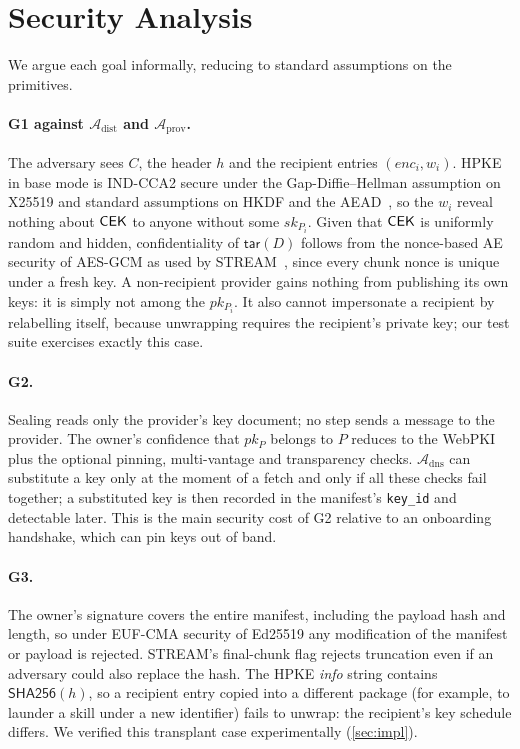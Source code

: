 \section{Security Analysis}
\label{sec:security}

We argue each goal informally, reducing to standard assumptions on the primitives.

\paragraph{G1 against $\mathcal{A}_{\text{dist}}$ and $\mathcal{A}_{\text{prov}}$.}
The adversary sees $C$, the header $h$ and the recipient entries $(enc_i, w_i)$. HPKE in base mode
is IND-CCA2 secure under the Gap-Diffie--Hellman assumption on X25519 and standard assumptions on
HKDF and the AEAD~\citep{rfc9180}, so the $w_i$ reveal nothing about $\mathsf{CEK}$ to anyone without some
$sk_{P_i}$. Given that $\mathsf{CEK}$ is uniformly random and hidden, confidentiality of $\mathsf{tar}(D)$
follows from the nonce-based AE security of AES-GCM as used by STREAM~\citep{hoang2015online}, since
every chunk nonce is unique under a fresh key. A non-recipient provider gains nothing from
publishing its own keys: it is simply not among the $pk_{P_i}$. It also cannot impersonate a
recipient by relabelling itself, because unwrapping requires the recipient's private key; our test
suite exercises exactly this case.

\paragraph{G2.} Sealing reads only the provider's key document; no step sends a message to the
provider. The owner's confidence that $pk_P$ belongs to $P$ reduces to the WebPKI plus the optional
pinning, multi-vantage and transparency checks. $\mathcal{A}_{\text{dns}}$ can substitute a key
only at the moment of a fetch and only if all these checks fail together; a substituted key is
then recorded in the manifest's \texttt{key\_id} and detectable later. This is the main security
cost of G2 relative to an onboarding handshake, which can pin keys out of band.

\paragraph{G3.} The owner's signature covers the entire manifest, including the payload hash and
length, so under EUF-CMA security of Ed25519 any modification of the manifest or payload is
rejected. STREAM's final-chunk flag rejects truncation even if an adversary could also replace the
hash. The HPKE \emph{info} string contains $\mathsf{SHA256}(h)$, so a recipient entry copied into a
different package (for example, to launder a skill under a new identifier) fails to unwrap: the
recipient's key schedule differs. We verified this transplant case experimentally
(\cref{sec:impl}).

